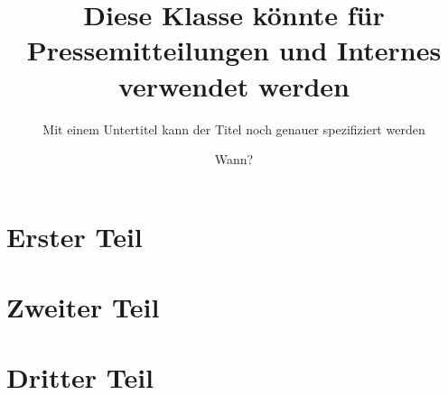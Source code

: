 \documentclass{S4F-FFM}
\title{Diese Klasse könnte für Pressemitteilungen und Internes verwendet werden}
\subtitle{Mit einem Untertitel kann der Titel noch genauer spezifiziert werden}
\date{Wann?}  %
\begin{document}
\setlength{\parindent}{0pt}

\maketitle  %
\onehalfspacing

\section{Erster Teil}

\lipsum[1]
\alert{\lipsum[2]}  %
\lipsum[3]

\section{Zweiter Teil}

\lipsum[4-6]

\section{Dritter Teil}

\lipsum[7-8]
\end{document}
